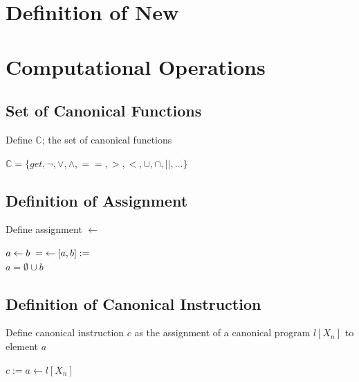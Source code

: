 \documentclass[11pt]{article}
\begin{document}
\section{Definition of New}




\section{Computational Operations}






\subsection{Set of Canonical Functions}
Define $\mathbb{C}$; the set of canonical functions
\begin{center}
$
\mathbb{C} = \{get,\lnot,\lor,\land,==,>,<,\cup,\cap,||,...\}
$
\end{center}




\subsection{Definition of Assignment}
Define assignment $\leftarrow$
\begin{center}
$
a \leftarrow b \hspace{1mm} = \hspace{1mm} \leftarrow[a,b] :=
$
\\ \vspace{2mm}
$
a = \emptyset \cup b
$
\end{center}





\subsection{Definition of Canonical Instruction}
Define canonical instruction $c$ as the assignment of a canonical program $l[X_n]$ to element $a$
\begin{center}
$
c := a \leftarrow l[X_n]
$
\end{center}








\end{document}
